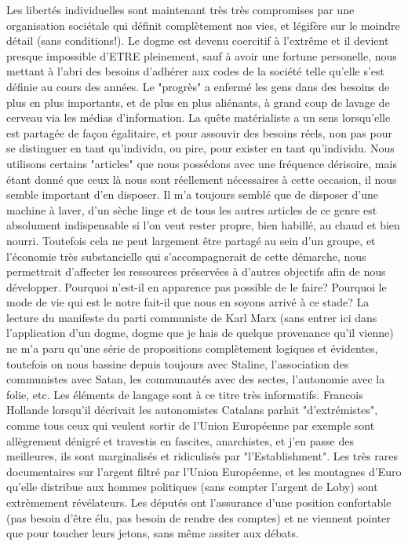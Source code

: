 \documentclass[11pt]{article} %
\begin{document}
Les libertés individuelles sont maintenant très très compromises par une organisation sociétale qui définit complètement nos vies, et légifère sur le moindre détail (sans conditions!). Le dogme est devenu coercitif à l'extrême et il devient presque impossible d'ETRE pleinement, sauf à avoir une fortune personelle, nous mettant à l'abri des besoins d'adhérer aux codes de la société telle qu'elle s'est définie au cours des années.
Le "progrès" a enfermé les gens dans des besoins de plus en plus importants, et de plus en plus aliénants, à grand coup de lavage de cerveau via les médias d'information.
La quête matérialiste a un sens lorsqu'elle est partagée de façon égalitaire, et pour assouvir des besoins réels, non pas pour se distinguer en tant qu'individu, ou pire, pour exister en tant qu'individu.
Nous utilisons certains "articles" que nous possédons avec une fréquence dérisoire, mais étant donné que ceux là nous sont réellement nécessaires à cette occasion, il nous semble important d'en disposer.
Il m'a toujours semblé que de disposer d'une machine à laver, d'un sèche linge et de tous les autres articles de ce genre est absolument indispensable si l'on veut rester propre, bien habillé, au chaud et bien nourri. Toutefois cela ne peut largement être partagé au sein d'un groupe, et l'économie très substancielle qui s'accompagnerait de cette démarche, nous permettrait d'affecter les ressources préservées à d'autres objectifs afin de nous développer. 
Pourquoi n'est-il en apparence pas possible de le faire?
Pourquoi le mode de vie qui est le notre fait-il que nous en soyons arrivé à ce stade?
La lecture du manifeste du parti communiste de Karl Marx (sans entrer ici dans l'application d'un dogme, dogme que je hais de quelque provenance qu'il vienne) ne m'a paru qu'une série de propositions complètement logiques et évidentes, toutefois on nous bassine depuis toujours avec Staline, l'association des communistes avec Satan, les communautés avec des sectes, l'autonomie avec la folie, etc. Les éléments de langage sont à ce titre très informatifs. Francois Hollande lorsqu'il décrivait les autonomistes Catalans parlait "d'extrémistes", comme tous ceux qui veulent sortir de l'Union Européenne par exemple sont allègrement dénigré et travestis en fascites, anarchistes, et j'en passe des meilleures, ils sont marginalisés et ridiculisés par "l'Establishment". Les très rares documentaires sur l'argent filtré par l'Union Européenne, et les montagnes d'Euro qu'elle distribue aux hommes politiques (sans compter l'argent de Loby) sont extrèmement révélateurs. Les députés ont l'assurance d'une position confortable (pas besoin d'être élu, pas besoin de rendre des comptes) et ne viennent pointer que pour toucher leurs jetons, sans même assiter aux débats. 
\end{document}

